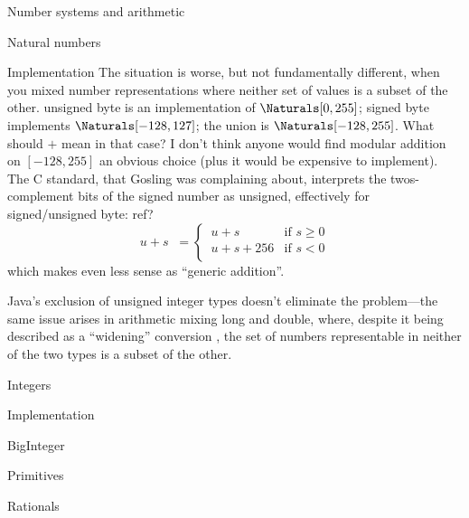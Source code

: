 \documentclass[12pt]{PalisadesLakesBook}
\begin{document}
\begin{plSection}{Number systems and arithmetic}
\begin{plSection}{Natural numbers}
\begin{plSection}{Implementation}
The situation is worse, but not fundamentally different,
when you mixed number representations where neither set of
values is a subset of the other.
{\javaFont unsigned byte} is an implementation of
$\Naturals[0,255]$;
{\javaFont signed byte} implements $\Naturals[-128,127]$;
the union is $\Naturals[-128,255]$.
What should $+$ mean in that case?
I don't think anyone would find modular addition
on $[-128,255]$ an obvious choice (plus it would be expensive to 
implement).
The C standard, that Gosling was complaining about,
interprets the twos-complement bits of the signed number
as unsigned, effectively for signed/unsigned byte:
\TODO ref?
\begin{equation}
u + s \; \;=
\begin{cases}
\, u + s & \text{if } s \geq 0 \\
\, u + s + 256 & \text{if } s < 0 \\
\end{cases}
\end{equation}
which makes even less sense as ``generic addition''.

\NOTE Java's exclusion of unsigned integer types doesn't
eliminate the problem---the same issue arises in arithmetic mixing
{\javaFont long} and {\javaFont double},
where, despite it being described as a ``widening'' conversion 
\cite[section 5.1.2]{GoslingEtAl:2021:JLS16},
the set of numbers representable in neither of the two types
is a subset of the other.

\end{plSection}%
\end{plSection}%
\begin{plSection}{Integers}


\begin{plSection}{Implementation}
\begin{plSection}{\javaFont BigInteger}

\end{plSection}%
\begin{plSection}{Primitives}

\end{plSection}%
\end{plSection}%
\end{plSection}%
\begin{plSection}{Rationals}



\end{plSection}
\end{plSection}
\end{document}
